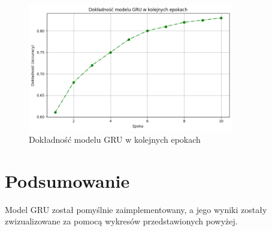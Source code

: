 \documentclass{article}
\begin{document}
\begin{figure}[H]
\centering
\includegraphics[width=0.8\textwidth]{accuracy_plot.png}
\caption{Dokładność modelu GRU w kolejnych epokach}
\end{figure}

\section{Podsumowanie}
Model GRU został pomyślnie zaimplementowany, a jego wyniki zostały zwizualizowane za pomocą wykresów przedstawionych powyżej.
\end{document}
